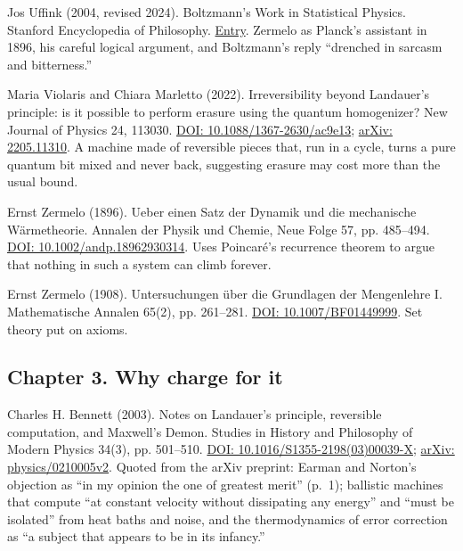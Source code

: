 \noindent Jos Uffink (2004, revised 2024). Boltzmann's Work in Statistical Physics. Stanford Encyclopedia of Philosophy. \href{https://plato.stanford.edu/entries/statphys-Boltzmann/}{Entry}. Zermelo as Planck's assistant in 1896, his careful logical argument, and Boltzmann's reply ``drenched in sarcasm and bitterness.''
\par\medskip

\noindent Maria Violaris and Chiara Marletto (2022). Irreversibility beyond Landauer's principle: is it possible to perform erasure using the quantum homogenizer? New Journal of Physics 24, 113030. \href{https://doi.org/10.1088/1367-2630/ac9e13}{DOI: 10.1088/1367-2630/ac9e13}; \href{https://arxiv.org/abs/2205.11310}{arXiv: 2205.11310}. A machine made of reversible pieces that, run in a cycle, turns a pure quantum bit mixed and never back, suggesting erasure may cost more than the usual bound.
\par\medskip

\noindent Ernst Zermelo (1896). Ueber einen Satz der Dynamik und die mechanische W\"armetheorie. Annalen der Physik und Chemie, Neue Folge 57, pp. 485--494. \href{https://doi.org/10.1002/andp.18962930314}{DOI: 10.1002/andp.18962930314}. Uses Poincar\'e's recurrence theorem to argue that nothing in such a system can climb forever.
\par\medskip

\noindent Ernst Zermelo (1908). Untersuchungen \"uber die Grundlagen der Mengenlehre I. Mathematische Annalen 65(2), pp. 261--281. \href{https://doi.org/10.1007/BF01449999}{DOI: 10.1007/BF01449999}. Set theory put on axioms.
\par\medskip

\subsection*{Chapter 3. Why charge for it}

\noindent Charles H. Bennett (2003). Notes on Landauer's principle, reversible computation, and Maxwell's Demon. Studies in History and Philosophy of Modern Physics 34(3), pp. 501--510. \href{https://doi.org/10.1016/S1355-2198(03)00039-X}{DOI: 10.1016/S1355-2198(03)00039-X}; \href{https://arxiv.org/abs/physics/0210005v2}{arXiv: physics/0210005v2}. Quoted from the arXiv preprint: Earman and Norton's objection as ``in my opinion the one of greatest merit'' (p.~1); ballistic machines that compute ``at constant velocity without dissipating any energy'' and ``must be isolated'' from heat baths and noise, and the thermodynamics of error correction as ``a subject that appears to be in its infancy.''
\par\medskip


